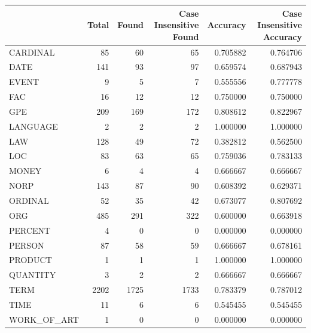 \begin{tabular}{lrrrrr}
\toprule
 & Total & Found & Case Insensitive Found & Accuracy & Case Insensitive Accuracy \\
\midrule
CARDINAL & 85 & 60 & 65 & 0.705882 & 0.764706 \\
DATE & 141 & 93 & 97 & 0.659574 & 0.687943 \\
EVENT & 9 & 5 & 7 & 0.555556 & 0.777778 \\
FAC & 16 & 12 & 12 & 0.750000 & 0.750000 \\
GPE & 209 & 169 & 172 & 0.808612 & 0.822967 \\
LANGUAGE & 2 & 2 & 2 & 1.000000 & 1.000000 \\
LAW & 128 & 49 & 72 & 0.382812 & 0.562500 \\
LOC & 83 & 63 & 65 & 0.759036 & 0.783133 \\
MONEY & 6 & 4 & 4 & 0.666667 & 0.666667 \\
NORP & 143 & 87 & 90 & 0.608392 & 0.629371 \\
ORDINAL & 52 & 35 & 42 & 0.673077 & 0.807692 \\
ORG & 485 & 291 & 322 & 0.600000 & 0.663918 \\
PERCENT & 4 & 0 & 0 & 0.000000 & 0.000000 \\
PERSON & 87 & 58 & 59 & 0.666667 & 0.678161 \\
PRODUCT & 1 & 1 & 1 & 1.000000 & 1.000000 \\
QUANTITY & 3 & 2 & 2 & 0.666667 & 0.666667 \\
TERM & 2202 & 1725 & 1733 & 0.783379 & 0.787012 \\
TIME & 11 & 6 & 6 & 0.545455 & 0.545455 \\
WORK_OF_ART & 1 & 0 & 0 & 0.000000 & 0.000000 \\
\bottomrule
\end{tabular}
